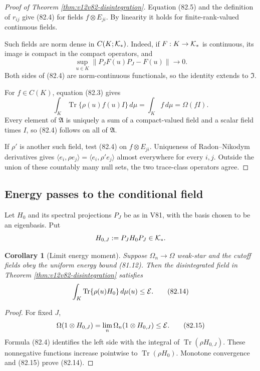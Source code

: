 \documentclass[11pt]{article}
\newtheorem{corollary}[theorem]{Corollary}
\theoremstyle{remark}
\begin{document}
\begin{proof}[Proof of Theorem \ref{thm:v12v82-disintegration}]
Equation (82.5) and the definition of \(r_{ij}\) give (82.4) for
fields \(f\otimes E_{ji}\).  By linearity it holds for
finite-rank-valued continuous fields.

Such fields are norm dense in
\(C(K;{\cal K}_*)\).  Indeed, if \(F:K\to{\cal K}_*\) is continuous,
its image is compact in the compact operators, and
\[
                         \sup_{u\in K}
 \|P_JF(u)P_J-F(u)\|\longrightarrow0.                       \tag{82.13}
\]
Both sides of (82.4) are norm-continuous functionals, so the identity
extends to \({\mathfrak I}\).

For \(f\in C(K)\), equation (82.3) gives
\[
 \int_K\operatorname{Tr}\{\rho(u)f(u)I\}\,d\mu
 =\int_Kf\,d\mu=\Omega(fI).
\]
Every element of \({\mathfrak A}\) is uniquely a sum of a
compact-valued field and a scalar field times \(I\), so (82.4)
follows on all of \({\mathfrak A}\).

If \(\rho'\) is another such field, test (82.4) on
\(f\otimes E_{ji}\).  Uniqueness of Radon--Nikodym derivatives gives
\(\langle e_i,\rho e_j\rangle
 =\langle e_i,\rho'e_j\rangle\) almost everywhere for every
\(i,j\).  Outside the union of these countably many null sets, the
two trace-class operators agree.
\end{proof}

\subsection{Energy passes to the conditional field}

Let \(H_0\) and its spectral projections \(P_J\) be as in V81, with
the basis chosen to be an eigenbasis.  Put
\[
                         H_{0,J}:=P_JH_0P_J\in{\cal K}_*.
\]

\begin{corollary}[Limit energy moment]
\label{cor:v12v82-energy}
Suppose \(\Omega_n\to\Omega\) weak-star and the cutoff fields obey
the uniform energy bound (81.12).  Then the disintegrated field in
Theorem \ref{thm:v12v82-disintegration} satisfies
\begin{equation}
 \int_K\operatorname{Tr}\{\rho(u)H_0\}\,d\mu(u)
 \leq{\cal E}.                                               \tag{82.14}
\end{equation}
\end{corollary}

\begin{proof}
For fixed \(J\),
\[
 \Omega(1\otimes H_{0,J})
 =\lim_n\Omega_n(1\otimes H_{0,J})
 \leq{\cal E}.                                               \tag{82.15}
\]
Formula (82.4) identifies the left side with the integral of
\(\operatorname{Tr}(\rho H_{0,J})\).  These nonnegative functions
increase pointwise to
\(\operatorname{Tr}(\rho H_0)\).  Monotone convergence and
(82.15) prove (82.14).
\end{proof}
\end{document}
